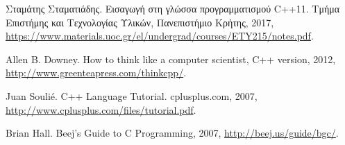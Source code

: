 \begin{thebibliography}{9}
Σταμάτης Σταματιάδης. Εισαγωγή στη γλώσσα προγραμματισμού C++11. Τμήμα Επιστήμης και Τεχνολογίας Υλικών, Πανεπιστήμιο Κρήτης, 2017, \href{https://www.materials.uoc.gr/el/undergrad/courses/ETY215/notes.pdf}{https://www.materials.uoc.gr/el/undergrad/courses/ETY215/notes.pdf}.

Allen B. Downey. How to think like a computer scientist, C++ version, 2012, \href{http://www.greenteapress.com/thinkcpp/}{http://www.greenteapress.com/thinkcpp/}. 

Juan Souli\'e. C++ Language Tutorial. cplusplus.com, 2007, \href{http://www.cplusplus.com/files/tutorial.pdf}{http://www.cplusplus.com/files/tutorial.pdf}.

Brian Hall. Beej's Guide to C Programming, 2007, \href{http://beej.us/guide/bgc/}{http://beej.us/guide/bgc/}.

\end{thebibliography}
